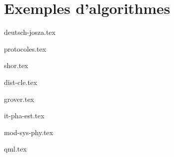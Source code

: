 \part{Exemples d'algorithmes}\label{part:exemples-d'algorithmes}
{deutsch-josza.tex}

{protocoles.tex}

{shor.tex}

{dist-cle.tex}

{grover.tex}

{it-pha-est.tex}

{mod-sys-phy.tex}

{qml.tex}
